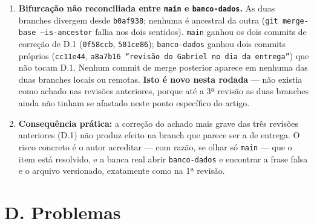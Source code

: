 \documentclass[11pt,a4paper]{article}
\begin{document}
\begin{enumerate}
  \item \textbf{Bifurcação não reconciliada entre \texttt{main} e \texttt{banco-dados}.} As duas
  branches divergem desde \texttt{b0af938}; nenhuma é ancestral da outra
  (\texttt{git merge-base --is-ancestor} falha nos dois sentidos). \texttt{main} ganhou os dois
  commits de correção de D.1 (\texttt{0f58ccb}, \texttt{501ce86}); \texttt{banco-dados} ganhou dois
  commits próprios (\texttt{cc11e44}, \texttt{a8a7b16 ``revisão do Gabriel no dia da entrega''}) que
  não tocam D.1. Nenhum commit de merge posterior aparece em nenhuma das duas branches locais ou
  remotas. \textbf{Isto é novo nesta rodada} --- não existia como achado nas revisões anteriores,
  porque até a 3ª revisão as duas branches ainda não tinham se afastado neste ponto específico do
  artigo.
  \item \textbf{Consequência prática:} a correção do achado mais grave das três revisões anteriores
  (D.1) não produz efeito na branch que parece ser a de entrega. O risco concreto é o autor acreditar
  --- com razão, se olhar só \texttt{main} --- que o item está resolvido, e a banca real abrir
  \texttt{banco-dados} e encontrar a frase falsa e o arquivo versionado, exatamente como na 1ª
  revisão.
\end{enumerate}

\section*{D. Problemas}
\end{document}
